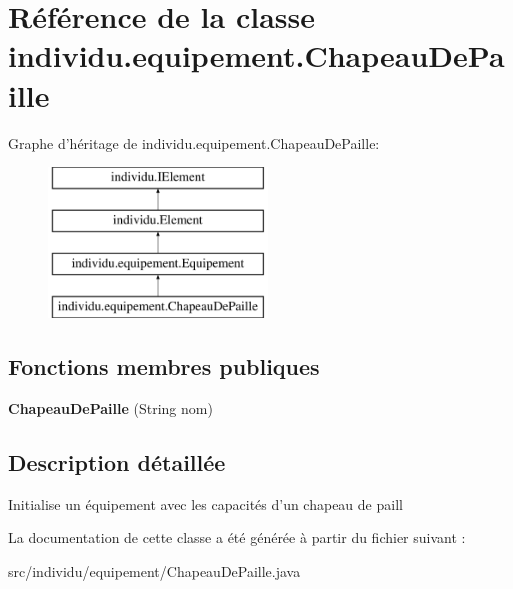 \hypertarget{classindividu_1_1equipement_1_1_chapeau_de_paille}{\section{Référence de la classe individu.\-equipement.\-Chapeau\-De\-Paille}
\label{classindividu_1_1equipement_1_1_chapeau_de_paille}
}
Graphe d'héritage de individu.\-equipement.\-Chapeau\-De\-Paille\-:\begin{figure}[H]
\begin{center}
\leavevmode
\includegraphics[height=4.000000cm]{classindividu_1_1equipement_1_1_chapeau_de_paille}
\end{center}
\end{figure}
\subsection*{Fonctions membres publiques}
\begin{DoxyCompactItemize}
\item 
\hypertarget{classindividu_1_1equipement_1_1_chapeau_de_paille_a51ef580b58d76d1642ef982fe78b90ab}{{\bfseries Chapeau\-De\-Paille} (String nom)}\label{classindividu_1_1equipement_1_1_chapeau_de_paille_a51ef580b58d76d1642ef982fe78b90ab}

\end{DoxyCompactItemize}


\subsection{Description détaillée}
Initialise un équipement avec les capacités d'un chapeau de paill 

La documentation de cette classe a été générée à partir du fichier suivant \-:\begin{DoxyCompactItemize}
\item 
src/individu/equipement/Chapeau\-De\-Paille.\-java\end{DoxyCompactItemize}
